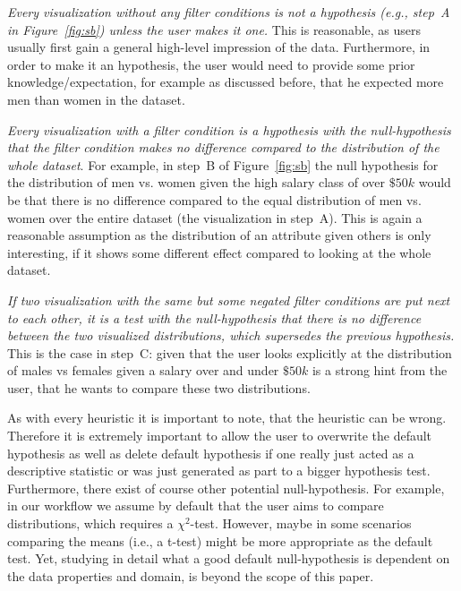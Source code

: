 \vspace{-1.75ex}
\begin{enumerate*}
    \item {\em Every visualization without any filter conditions is not a hypothesis (e.g., step~A in Figure~\ref{fig:sb}) unless the user makes it one. } This is reasonable, as users usually first gain a general high-level impression of the data. Furthermore, in order to make it an hypothesis, the user would need to provide some prior knowledge/expectation, for example as discussed before, that he expected more men than women in the dataset. 
    \item {\em Every visualization with a filter condition is a hypothesis with the null-hypothesis that the filter condition makes no difference compared to the distribution of the whole dataset}. For example, in step~B of Figure~\ref{fig:sb} the null hypothesis for the distribution of men vs. women given the high salary class of over $\$50k$ would be that there is no difference compared to the equal distribution of men vs. women over the entire dataset (the visualization in step~A). This is again a reasonable assumption as the distribution of an attribute given others is only interesting, if it shows some different effect compared to looking at the whole dataset. 
    \item {\em If two visualization with the same but some negated filter conditions are put next to each other, it is a test with the null-hypothesis that there is no difference between the two visualized distributions, which supersedes the previous hypothesis.} This is the case in step~C: given that the user looks explicitly at the distribution of males vs females given a salary over and under $\$50k$ is a strong hint from the user, that he wants to compare these two distributions. 
\end{enumerate*}
\vspace{-2.0ex}

As with every heuristic it is important to note, that the heuristic can be wrong. 
Therefore it is extremely important to allow the user to overwrite the default hypothesis as well as delete default hypothesis if one really just acted as a descriptive statistic or was just generated as part to a bigger hypothesis test. 
Furthermore, there exist of course other potential null-hypothesis.
For example, in our workflow we assume by default that the user aims to compare distributions, which requires a  $\chi^2$-test.
However, maybe in some scenarios comparing the means (i.e., a t-test) might be more appropriate as the default test. Yet, studying in detail what a good default null-hypothesis is dependent on the data properties and domain, is beyond the scope of this paper. 

